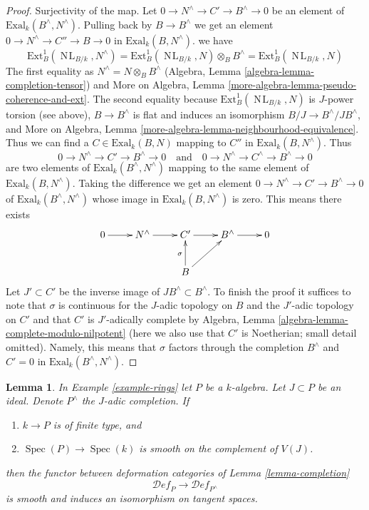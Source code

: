\documentclass{stacks-project}
\theoremstyle{plain}
\newtheorem{lemma}[subsection]{Lemma}
\theoremstyle{definition}
\theoremstyle{remark}
\numberwithin{equation}{subsection}
\def\Spec{\mathop{\mathrm{Spec}}}
\def\NL{\mathop{N\!L}\nolimits}
\def\Deformationcategory{\mathcal{D}\!\mathit{ef}}
\begin{document}
\begin{proof}
\medskip\noindent
Surjectivity of the map. Let $0 \to N^\wedge \to C' \to B^\wedge \to 0$
be an element of $\text{Exal}_k(B^\wedge, N^\wedge)$.
Pulling back by $B \to B^\wedge$ we get an element
$0 \to N^\wedge \to C'' \to B \to 0$ in
$\text{Exal}_k(B, N^\wedge)$.
we have
$$
\text{Ext}^1_B(\NL_{B/k}, N^\wedge) =
\text{Ext}^1_B(\NL_{B/k}, N) \otimes_B B^\wedge =
\text{Ext}^1_B(\NL_{B/k}, N)
$$
The first equality as $N^\wedge = N \otimes_B B^\wedge$
(Algebra, Lemma \ref{algebra-lemma-completion-tensor})
and
More on Algebra, Lemma \ref{more-algebra-lemma-pseudo-coherence-and-ext}.
The second equality because $\text{Ext}^1_B(\NL_{B/k}, N)$
is $J$-power torsion (see above), $B \to B^\wedge$ is flat and induces
an isomorphism $B/J \to B^\wedge/JB^\wedge$, and
More on Algebra, Lemma \ref{more-algebra-lemma-neighbourhood-equivalence}.
Thus we can find a $C \in \text{Exal}_k(B, N)$ mapping to $C''$ in
$\text{Exal}_k(B, N^\wedge)$.
Thus
$$
0 \to N^\wedge \to C' \to B^\wedge \to 0
\quad\text{and}\quad
0 \to N^\wedge \to C^\wedge \to B^\wedge \to 0
$$
are two elements of $\text{Exal}_k(B^\wedge, N^\wedge)$
mapping to the same element of $\text{Exal}_k(B, N^\wedge)$.
Taking the difference we get an element
$0 \to N^\wedge \to C' \to B^\wedge \to 0$ of
$\text{Exal}_k(B^\wedge, N^\wedge)$
whose image in $\text{Exal}_k(B, N^\wedge)$ is zero.
This means there exists
$$
\xymatrix{
0 \ar[r] &
N^\wedge \ar[r] &
C' \ar[r] &
B^\wedge \ar[r] & 0 \\
& & B \ar[u]^\sigma \ar[ru]
}
$$
Let $J' \subset C'$ be the inverse image of $JB^\wedge \subset B^\wedge$.
To finish the proof it suffices to note that
$\sigma$ is continuous for the $J$-adic topology on $B$
and the $J'$-adic topology on $C'$ and that $C'$ is $J'$-adically complete by
Algebra, Lemma \ref{algebra-lemma-complete-modulo-nilpotent}
(here we also use that $C'$ is Noetherian; small detail omitted).
Namely, this means that $\sigma$ factors through the
completion $B^\wedge$ and $C' = 0$ in $\text{Exal}_k(B^\wedge, N^\wedge)$.
\end{proof}

\begin{lemma}
\label{lemma-smooth-completion}
In Example \ref{example-rings} let $P$ be a $k$-algebra.
Let $J \subset P$ be an ideal.
Denote $P^\wedge$ the $J$-adic completion. If
\begin{enumerate}
\item $k \to P$ is of finite type, and
\item $\Spec(P) \to \Spec(k)$ is smooth on the complement of $V(J)$.
\end{enumerate}
then the functor between deformation categories of
Lemma \ref{lemma-completion}
$$
\Deformationcategory_P \longrightarrow \Deformationcategory_{P^\wedge}
$$
is smooth and induces an isomorphism on tangent spaces.
\end{lemma}
\end{document}
